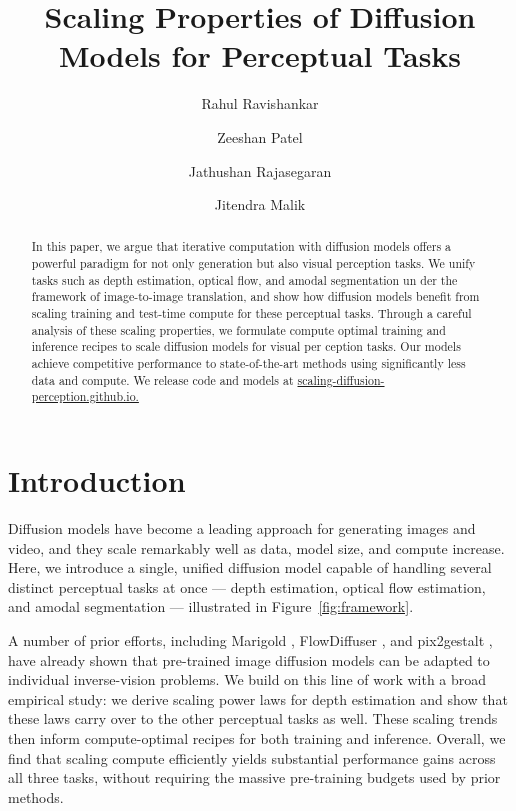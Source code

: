 \documentclass[manuscript,screen,review]{acmart}
\title{Scaling Properties of Diffusion Models for Perceptual Tasks}
\author{Rahul Ravishankar}
\author{Zeeshan Patel}
\author{Jathushan Rajasegaran}
\author{Jitendra Malik}
\affiliation{%
  \institution{University of California, Berkeley}
  \country{USA}
}
\begin{document}
\begin{abstract}
In this paper, we argue that iterative computation with diffusion models offers a
powerful paradigm for not only generation but also visual perception tasks. We
unify tasks such as depth estimation, optical flow, and amodal segmentation un
der the framework of image-to-image translation, and show how diffusion models
benefit from scaling training and test-time compute for these perceptual tasks.
Through a careful analysis of these scaling properties, we formulate compute
optimal training and inference recipes to scale diffusion models for visual per
ception tasks. Our models achieve competitive performance to state-of-the-art
methods using significantly less data and compute. We release code and models
at \href{https://github.com/scaling-diffusion-perception/scaling-diffusion-perception}{scaling-diffusion-perception.github.io.}
\end{abstract}

\maketitle

\section{Introduction}

Diffusion models have become a leading approach for generating images and video, and they scale remarkably well as data, model size, and compute increase. Here, we introduce a single, unified diffusion model capable of handling several distinct perceptual tasks at once --- depth estimation, optical flow estimation, and amodal segmentation --- illustrated in Figure~\ref{fig:framework}.

A number of prior efforts, including Marigold \citep{ke2024repurposing}, FlowDiffuser \citep{luo2024flowdiffuser}, and pix2gestalt \citep{ozguroglu2024pix2gestalt}, have already shown that pre-trained image diffusion models can be adapted to individual inverse-vision problems. We build on this line of work with a broad empirical study: we derive scaling power laws for depth estimation and show that these laws carry over to the other perceptual tasks as well. These scaling trends then inform compute-optimal recipes for both training and inference. Overall, we find that scaling compute efficiently yields substantial performance gains across all three tasks, without requiring the massive pre-training budgets used by prior methods.
\end{document}
